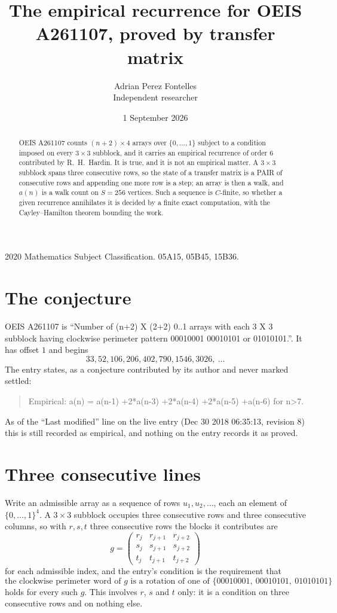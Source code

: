 \documentclass[11pt,a4paper]{article}
\title{The empirical recurrence for OEIS A261107, proved by transfer matrix}
\author{Adrian Perez Fontelles\\ \small Independent researcher}
\date{1 September 2026}
\theoremstyle{plain}
\theoremstyle{definition}
\begin{document}
\maketitle

\begin{abstract}
OEIS A261107 counts $(n+2)\times4$ arrays over $\{0,\dots,1\}$ subject to a condition imposed on
every $3\times3$ subblock, and it carries an empirical recurrence of order $6$
contributed by R.~H.~Hardin. It is true, and it is not an empirical matter. A $3\times3$
subblock spans three consecutive rows, so the state of a transfer matrix is a PAIR of
consecutive rows and appending one more row is a step; an array is then a walk, and
$a(n)$ is a walk count on $S=256$ vertices. Such a sequence is $C$-finite, so whether a given
recurrence annihilates it is decided by a finite exact computation, with the Cayley--Hamilton
theorem bounding the work.
\end{abstract}

\noindent\small 2020 Mathematics Subject Classification. 05A15, 05B45, 15B36.\normalsize

\section{The conjecture}

OEIS A261107 is ``Number of (n+2) X (2+2) 0..1 arrays with each 3 X 3 subblock having clockwise perimeter pattern 00010001 00010101 or 01010101.''. It has offset $1$ and begins
\[
33, 52, 106, 206, 402, 790, 1546, 3026,\ \dots
\]
The entry states, as a conjecture contributed by its author and never marked settled:
\begin{quote}
Empirical: a(n) = a(n-1) +2*a(n-3) +2*a(n-4) +2*a(n-5) +a(n-6) for n>7.
\end{quote}
As of the ``Last modified'' line on the live entry (Dec 30 2018 06:35:13, revision 8) this is still
recorded as empirical, and nothing on the entry records it as proved.

\section{Three consecutive lines}

Write an admissible array as a sequence of rows $u_1,u_2,\dots$, each an element of
$\{0,\dots,1\}^{4}$. A $3\times3$ subblock occupies three consecutive rows and
three consecutive columns, so with $r,s,t$ three consecutive rows the blocks it
contributes are
\[
g=\begin{pmatrix}r_j&r_{j+1}&r_{j+2}\\ s_j&s_{j+1}&s_{j+2}\\ t_j&t_{j+1}&t_{j+2}\end{pmatrix}
\]
for each admissible index, and the entry's condition is the requirement that
\[
\text{the clockwise perimeter word of }g\text{ is a rotation of one of }\{00010001,\ 00010101,\ 01010101\}
\]
holds for every such $g$. This involves $r$, $s$ and $t$ only: it is a condition on
three consecutive rows and on nothing else.
\end{document}
